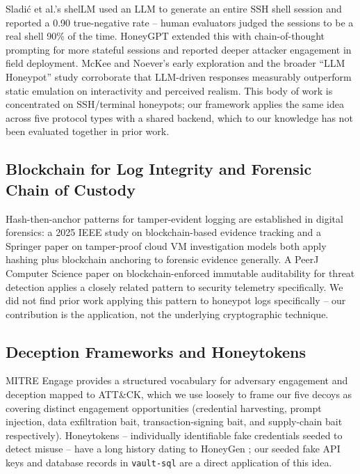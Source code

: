 \documentclass[conference]{IEEEtran}
\begin{document}
Sladi\'{c} et al.'s shelLM \cite{sladic2024shellm} used an LLM to generate an
entire SSH shell session and reported a 0.90 true-negative rate -- human
evaluators judged the sessions to be a real shell 90\% of the time. HoneyGPT
\cite{wang2024honeygpt} extended this with chain-of-thought prompting for more
stateful sessions and reported deeper attacker engagement in field deployment.
McKee and Noever's early exploration \cite{mckee2023chatbots} and the broader
``LLM Honeypot'' study \cite{llmhoneypot2024} corroborate that LLM-driven
responses measurably outperform static emulation on interactivity and
perceived realism. This body of work is concentrated on SSH/terminal
honeypots; our framework applies the same idea across five protocol types
with a shared backend, which to our knowledge has not been evaluated together
in prior work.

\subsection{Blockchain for Log Integrity and Forensic Chain of Custody}

Hash-then-anchor patterns for tamper-evident logging are established in
digital forensics: a 2025 IEEE study on blockchain-based evidence tracking
\cite{blockchainevidence2025} and a Springer paper on tamper-proof cloud VM
investigation models \cite{cloudvmforensics2022} both apply hashing plus
blockchain anchoring to forensic evidence generally. A PeerJ Computer Science
paper on blockchain-enforced immutable auditability for threat detection
\cite{peerjthreat2025} applies a closely related pattern to security telemetry
specifically. We did not find prior work applying this pattern to honeypot
logs specifically -- our contribution is the application, not the underlying
cryptographic technique.

\subsection{Deception Frameworks and Honeytokens}

MITRE Engage \cite{mitreengage2022} provides a structured vocabulary for
adversary engagement and deception mapped to ATT\&CK, which we use loosely to
frame our five decoys as covering distinct engagement opportunities
(credential harvesting, prompt injection, data exfiltration bait,
transaction-signing bait, and supply-chain bait respectively). Honeytokens --
individually identifiable fake credentials seeded to detect misuse -- have a
long history dating to HoneyGen \cite{bercovitch2011honeygen}; our seeded fake
API keys and database records in \texttt{vault-sql} are a direct application
of this idea.
\end{document}
